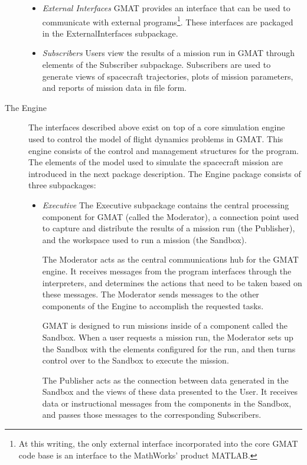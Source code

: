 \begin{description}
\begin{itemize}
    \item \textit{External Interfaces} GMAT provides an
interface that can be used to communicate with external programs\footnote{At this writing, the only
external interface incorporated into the core GMAT code base is an interface to the MathWorks'
product MATLAB\cite{MATLAB}.}.  These interfaces are packaged in the ExternalInterfaces subpackage.

    \item \textit{Subscribers} Users view the
results of a mission run in GMAT through elements of the Subscriber subpackage.  Subscribers are
used to generate views of spacecraft trajectories, plots of mission parameters, and reports of
mission data in file form.

  \end{itemize}
  \item[The Engine] The interfaces described above exist on top of a core simulation
engine used to control the model of flight dynamics problems in GMAT.  This engine consists of the
control and management structures for the program. The elements of the model used to simulate the
spacecraft mission are introduced in the next package description.  The Engine package consists of
three subpackages:
  \begin{itemize}
    \item \textit{Executive} The Executive subpackage contains
the central processing component for GMAT (called the Moderator), a connection point used to capture
and distribute the results of a mission run (the Publisher), and the workspace used to run a mission
(the Sandbox).

    The Moderator acts as the central communications hub for the GMAT engine.  It receives messages
from the program interfaces through the interpreters, and determines the actions that need to be
taken based on these messages.  The Moderator sends messages to the other components of the Engine
to accomplish the requested tasks.

    GMAT is designed to run missions inside of a component called the Sandbox.  When a user requests
a mission run, the Moderator sets up the Sandbox with the elements configured for the run, and then
turns control over to the Sandbox to execute the mission.

    The Publisher acts as the connection between data generated in the Sandbox and the views of
these data presented to the User.  It receives data or instructional messages from the components in
the Sandbox, and passes those messages to the corresponding Subscribers.


\end{itemize}
\end{description}
